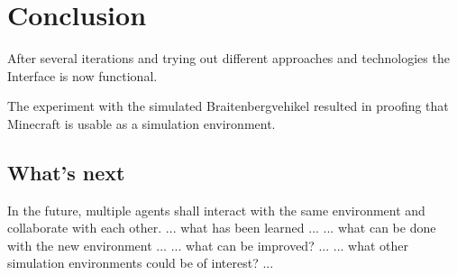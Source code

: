 \chapter{Conclusion}
After several iterations and trying out different approaches and technologies the Interface is now functional.

The experiment with the simulated Braitenbergvehikel resulted in proofing that Minecraft is usable as a simulation environment.

\section{What's next}
In the future, multiple agents shall interact with the same environment and collaborate with each other.
... what has been learned ...
... what can be done with the new environment ...
... what can be improved? ...
... what other simulation environments could be of interest? ...